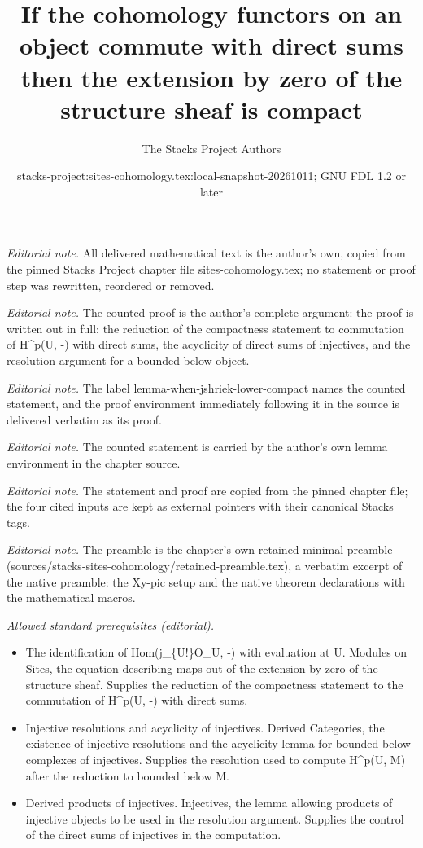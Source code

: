 \documentclass[10pt,a4paper]{amsart}
\title{If the cohomology functors on an object commute with direct sums then the extension by zero of the structure sheaf is compact}
\author{The Stacks Project Authors}
\date{stacks-project:sites-cohomology.tex:local-snapshot-20261011; GNU FDL 1.2 or later}
\theoremstyle{plain}
\theoremstyle{definition}
\theoremstyle{remark}
\numberwithin{equation}{subsection}
\begin{document}
\maketitle
\noindent\textit{Editorial note.} All delivered mathematical text is the author's own, copied from the pinned Stacks Project chapter file sites-cohomology.tex; no statement or proof step was rewritten, reordered or removed.\par\medskip
\noindent\textit{Editorial note.} The counted proof is the author's complete argument: the proof is written out in full: the reduction of the compactness statement to commutation of H\textasciicircum{}p(U, -) with direct sums, the acyclicity of direct sums of injectives, and the resolution argument for a bounded below object.\par\medskip
\noindent\textit{Editorial note.} The label lemma-when-jshriek-lower-compact names the counted statement, and the proof environment immediately following it in the source is delivered verbatim as its proof.\par\medskip
\noindent\textit{Editorial note.} The counted statement is carried by the author's own lemma environment in the chapter source.\par\medskip
\noindent\textit{Editorial note.} The statement and proof are copied from the pinned chapter file; the four cited inputs are kept as external pointers with their canonical Stacks tags.\par\medskip
\noindent\textit{Editorial note.} The preamble is the chapter's own retained minimal preamble (sources/stacks-sites-cohomology/retained-preamble.tex), a verbatim excerpt of the native preamble: the Xy-pic setup and the native theorem declarations with the mathematical macros.\par\medskip
\noindent\textit{Allowed standard prerequisites (editorial).}\begin{itemize}
\item The identification of Hom(j\_\{U!\}O\_U, -) with evaluation at U. Modules on Sites, the equation describing maps out of the extension by zero of the structure sheaf. Supplies the reduction of the compactness statement to the commutation of H\textasciicircum{}p(U, -) with direct sums.
\item Injective resolutions and acyclicity of injectives. Derived Categories, the existence of injective resolutions and the acyclicity lemma for bounded below complexes of injectives. Supplies the resolution used to compute H\textasciicircum{}p(U, M) after the reduction to bounded below M.
\item Derived products of injectives. Injectives, the lemma allowing products of injective objects to be used in the resolution argument. Supplies the control of the direct sums of injectives in the computation.
\end{itemize}\medskip
\end{document}
